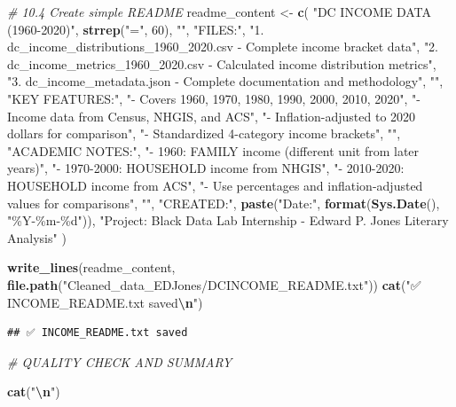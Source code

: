 \documentclass[
]{article}
\newenvironment{Shaded}{\begin{snugshade}}{\end{snugshade}}
\newcommand{\CommentTok}[1]{\textcolor[rgb]{0.56,0.35,0.01}{\textit{#1}}}
\newcommand{\DecValTok}[1]{\textcolor[rgb]{0.00,0.00,0.81}{#1}}
\newcommand{\FunctionTok}[1]{\textcolor[rgb]{0.13,0.29,0.53}{\textbf{#1}}}
\newcommand{\NormalTok}[1]{#1}
\newcommand{\OtherTok}[1]{\textcolor[rgb]{0.56,0.35,0.01}{#1}}
\newcommand{\SpecialCharTok}[1]{\textcolor[rgb]{0.81,0.36,0.00}{\textbf{#1}}}
\newcommand{\StringTok}[1]{\textcolor[rgb]{0.31,0.60,0.02}{#1}}
\begin{document}
\begin{Shaded}
\begin{Highlighting}[]
\CommentTok{\# 10.4 Create simple README}
\NormalTok{readme\_content }\OtherTok{\textless{}{-}} \FunctionTok{c}\NormalTok{(}
  \StringTok{"DC INCOME DATA (1960{-}2020)"}\NormalTok{,}
  \FunctionTok{strrep}\NormalTok{(}\StringTok{"="}\NormalTok{, }\DecValTok{60}\NormalTok{),}
  \StringTok{""}\NormalTok{,}
  \StringTok{"FILES:"}\NormalTok{,}
  \StringTok{"1. dc\_income\_distributions\_1960\_2020.csv {-} Complete income bracket data"}\NormalTok{,}
  \StringTok{"2. dc\_income\_metrics\_1960\_2020.csv {-} Calculated income distribution metrics"}\NormalTok{,}
  \StringTok{"3. dc\_income\_metadata.json {-} Complete documentation and methodology"}\NormalTok{,}
  \StringTok{""}\NormalTok{,}
  \StringTok{"KEY FEATURES:"}\NormalTok{,}
  \StringTok{"{-} Covers 1960, 1970, 1980, 1990, 2000, 2010, 2020"}\NormalTok{,}
  \StringTok{"{-} Income data from Census, NHGIS, and ACS"}\NormalTok{,}
  \StringTok{"{-} Inflation{-}adjusted to 2020 dollars for comparison"}\NormalTok{,}
  \StringTok{"{-} Standardized 4{-}category income brackets"}\NormalTok{,}
  \StringTok{""}\NormalTok{,}
  \StringTok{"ACADEMIC NOTES:"}\NormalTok{,}
  \StringTok{"{-} 1960: FAMILY income (different unit from later years)"}\NormalTok{,}
  \StringTok{"{-} 1970{-}2000: HOUSEHOLD income from NHGIS"}\NormalTok{,}
  \StringTok{"{-} 2010{-}2020: HOUSEHOLD income from ACS"}\NormalTok{,}
  \StringTok{"{-} Use percentages and inflation{-}adjusted values for comparisons"}\NormalTok{,}
  \StringTok{""}\NormalTok{,}
  \StringTok{"CREATED:"}\NormalTok{,}
  \FunctionTok{paste}\NormalTok{(}\StringTok{"Date:"}\NormalTok{, }\FunctionTok{format}\NormalTok{(}\FunctionTok{Sys.Date}\NormalTok{(), }\StringTok{"\%Y{-}\%m{-}\%d"}\NormalTok{)),}
  \StringTok{"Project: Black Data Lab Internship {-} Edward P. Jones Literary Analysis"}
\NormalTok{)}

\FunctionTok{write\_lines}\NormalTok{(readme\_content, }\FunctionTok{file.path}\NormalTok{(}\StringTok{"Cleaned\_data\_EDJones/DCINCOME\_README.txt"}\NormalTok{))}
\FunctionTok{cat}\NormalTok{(}\StringTok{"✅ INCOME\_README.txt saved}\SpecialCharTok{\textbackslash{}n}\StringTok{"}\NormalTok{)}
\end{Highlighting}
\end{Shaded}

\begin{verbatim}
## ✅ INCOME_README.txt saved
\end{verbatim}

\begin{Shaded}
\begin{Highlighting}[]
\CommentTok{\# QUALITY CHECK AND SUMMARY}


\FunctionTok{cat}\NormalTok{(}\StringTok{"}\SpecialCharTok{\textbackslash{}n}\StringTok{"}\NormalTok{)  }
\end{Highlighting}
\end{Shaded}
\end{document}
